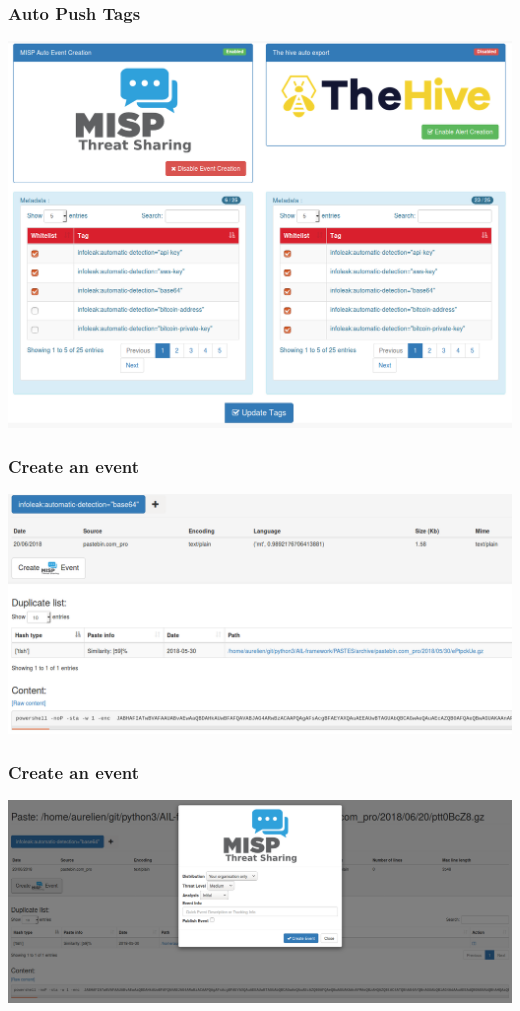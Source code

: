 \begin{frame}
    \frametitle{Auto Push Tags}
    \centerline{\includegraphics[scale=0.25]{screenshot/tag_auto_export.png}}
\end{frame}

\begin{frame}
    \frametitle{Create an event}
    \centerline{\includegraphics[scale=0.25]{screenshot/create-event-base64.png}}
\end{frame}

\begin{frame}
    \frametitle{Create an event}
    \centerline{\includegraphics[scale=0.25]{screenshot/create-misp-event-base64.png}}
\end{frame}

